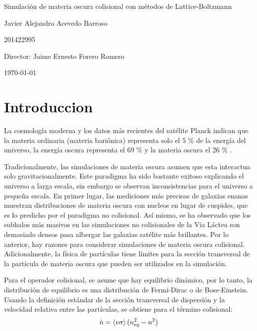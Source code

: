 \documentclass[12pt]{article}
\begin{document}
\begin{center}
\Huge
Simulación de materia oscura colisional con métodos de Lattice-Boltzmann

\vspace{3mm}
\Large Javier Alejandro Acevedo Barroso

\large
201422995


\vspace{2mm}
\Large
Director: Jaime Ernesto Forero Romero

\normalsize
\vspace{2mm}

\today
\end{center}


\normalsize
\newpage
\section{Introduccion}
La cosmología moderna y los datos más recientes del satélite Planck indican que la materia ordinaria (materia bariónica) representa solo el 5 \% de la energía del universo, la energía oscura representa el 69 \% y la materia oscura el 26 \% \cite{planckCitetion}.

Tradicionalmente, las simulaciones de materia oscura asumen que esta interactua solo gravitacionalmente. Este paradigma ha sido bastante exitoso explicando el universo a larga escala, sin embargo se observan inconsistencias para el universo a pequeña escala. En primer lugar, las mediciones más precisas de galaxias enanas muestran distribuciones de materia oscura con nucleos en lugar de cuspides, que es lo predicho por el paradigma no colisional. Así mismo, se ha observado que los subhalos más masivos en las simulaciones no colisionales de la Vía Láctea son demasiado densos pasa albergar las galaxias satélite más brillantes\cite{beyondColl}. Por lo anterior, hay razones para considerar simulaciones de materia oscura colisional. Adicionalmente, la física de partículas tiene límites para la sección transversal de la partícula de materia oscura que pueden ser utilizados en la simulación.

Para el operador colisional, se asume que hay equilibrio dinámico, por lo tanto, la distribución de equilibrio es una distribución de Fermi-Dirac o de Bose-Einstein. Usando la definición estándar de la sección transversal de dispersión y la velocidad relativa entre las partículas, se obtiene para el término colisional\cite{mariangela}:
\begin{equation}
\dot{n} = \expval{v \sigma} (n_{eq}^2 - n^2)
\label{colision}
\end{equation}
\end{document}
